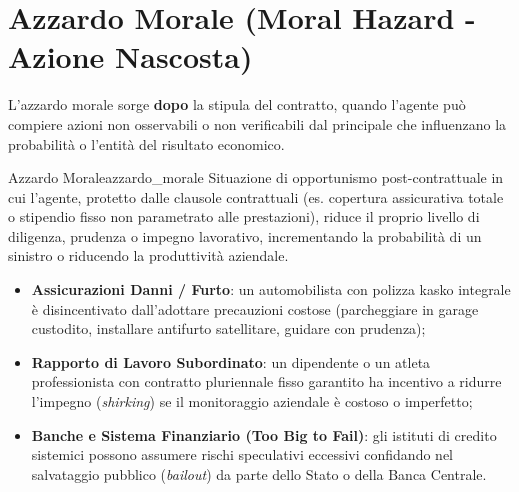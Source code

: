 \section{Azzardo Morale (Moral Hazard - Azione Nascosta)}

L'azzardo morale sorge \textbf{dopo} la stipula del contratto, quando l'agente può compiere azioni non osservabili o non verificabili dal principale che influenzano la probabilità o l'entità del risultato economico.

\begin{definizione}{Azzardo Morale}{azzardo_morale}
Situazione di opportunismo post-contrattuale in cui l'agente, protetto dalle clausole contrattuali (es. copertura assicurativa totale o stipendio fisso non parametrato alle prestazioni), riduce il proprio livello di diligenza, prudenza o impegno lavorativo, incrementando la probabilità di un sinistro o riducendo la produttività aziendale.
\end{definizione}

\begin{esempio}
\begin{itemize}
    \item \textbf{Assicurazioni Danni / Furto}: un automobilista con polizza kasko integrale è disincentivato dall'adottare precauzioni costose (parcheggiare in garage custodito, installare antifurto satellitare, guidare con prudenza);
    \item \textbf{Rapporto di Lavoro Subordinato}: un dipendente o un atleta professionista con contratto pluriennale fisso garantito ha incentivo a ridurre l'impegno (\textit{shirking}) se il monitoraggio aziendale è costoso o imperfetto;
    \item \textbf{Banche e Sistema Finanziario (Too Big to Fail)}: gli istituti di credito sistemici possono assumere rischi speculativi eccessivi confidando nel salvataggio pubblico (\textit{bailout}) da parte dello Stato o della Banca Centrale.
\end{itemize}
\end{esempio}

